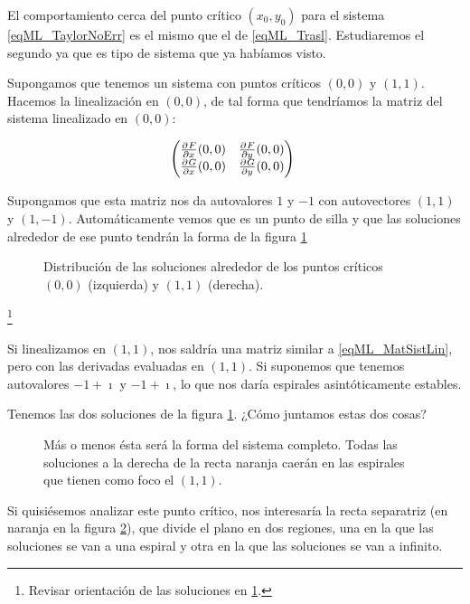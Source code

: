 El comportamiento cerca del punto crítico $(x_0, y_0)$ para el sistema \eqref{eqML_TaylorNoErr} es el mismo que el de \eqref{eqML_Trasl}. Estudiaremos el segundo ya que es tipo de sistema que ya habíamos visto.

Supongamos que tenemos un sistema con puntos críticos $(0,0)$ y $(1,1)$. Hacemos la linealización en $(0,0)$, de tal forma que tendríamos la matriz del sistema linealizado en $(0,0)$:

\begin{equation} \label{eqML_MatSistLin} \begin{pmatrix}
\pd{F}{x}(0,0) & \pd{F}{y}(0,0) \\
\pd{G}{x}(0,0) & \pd{G}{y}(0,0)
\end{pmatrix} \end{equation}

Supongamos que esta matriz nos da autovalores $1$ y $-1$ con autovectores $(1,1)$ y $(1,-1)$. Automáticamente vemos que es un punto de silla y que las soluciones alrededor de ese punto tendrán la forma de la figura \ref{imgML_Silla}

\begin{figure}[hbtp]
\caption{Distribución de las soluciones alrededor de los puntos críticos $(0,0)$ (izquierda) y $(1,1)$ (derecha).}
\label{imgML_Silla}
\end{figure}

\footnote{Revisar orientación de las soluciones en \ref{imgML_Silla}.}

Si linealizamos en $(1,1)$, nos saldría una matriz similar a \eqref{eqML_MatSistLin}, pero con las derivadas evaluadas en $(1,1)$. Si suponemos que tenemos autovalores $-1+\imath$ y $-1+\imath$, lo que nos daría espirales asintóticamente estables.

Tenemos las dos soluciones de la figura \ref{imgML_Silla}. ¿Cómo juntamos estas dos cosas? 

\begin{figure}[hbtp]
\caption{Más o menos ésta será la forma del sistema completo. Todas las soluciones a la derecha de la recta naranja caerán en las espirales que tienen como foco el $(1,1)$.}
\label{imgMLSoluciones}
\end{figure}

Si quisiésemos analizar este punto crítico, nos interesaría la recta separatriz (en naranja en la figura \ref{imgMLSoluciones}), que divide el plano en dos regiones, una en la que las soluciones se van a una espiral y otra en la que las soluciones se van a infinito. 

